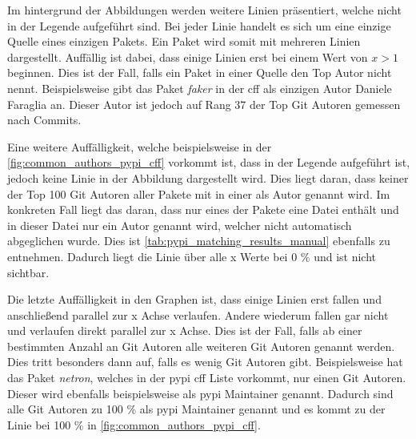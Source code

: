 Im hintergrund der Abbildungen werden weitere Linien präsentiert, welche nicht in der Legende aufgeführt sind.
Bei jeder Linie handelt es sich um eine einzige Quelle eines einzigen Pakets.
Ein Paket wird somit mit mehreren Linien dargestellt.
Auffällig ist dabei, dass einige Linien erst bei einem Wert von $x>1$ beginnen.
Dies ist der Fall, falls ein Paket in einer Quelle den Top Autor nicht nennt.
Beispielsweise gibt das Paket \emph{faker} in der \gls{cff} als einzigen Autor \glqq Daniele Faraglia\grqq{} an.
Dieser Autor ist jedoch auf Rang 37 der Top Git Autoren gemessen nach Commits.

Eine weitere Auffälligkeit, welche beispielsweise in der \autoref{fig:common_authors_pypi_cff} vorkommt ist, dass in der Legende  aufgeführt ist, jedoch keine Linie in der Abbildung dargestellt wird.
Dies liegt daran, dass keiner der Top 100 Git Autoren aller Pakete mit  in einer  als Autor genannt wird.
Im konkreten Fall liegt das daran, dass nur eines der Pakete eine  Datei enthält und in dieser Datei nur ein Autor genannt wird, welcher nicht automatisch abgeglichen wurde.
Dies ist \autoref{tab:pypi_matching_results_manual} ebenfalls zu entnehmen.
Dadurch liegt die Linie über alle x Werte bei 0 \% und ist nicht sichtbar.

Die letzte Auffälligkeit in den Graphen ist, dass einige Linien erst fallen und anschließend parallel zur x Achse verlaufen.
Andere wiederum fallen gar nicht und verlaufen direkt parallel zur x Achse.
Dies ist der Fall, falls ab einer bestimmten Anzahl an Git Autoren alle weiteren Git Autoren genannt werden.
Dies tritt besonders dann auf, falls es wenig Git Autoren gibt.
Beispielsweise hat das Paket \emph{netron}, welches in der \gls{pypi} \gls{cff} Liste vorkommt, nur einen Git Autoren.
Dieser wird ebenfalls beispielsweise als \gls{pypi} Maintainer genannt.
Dadurch sind alle Git Autoren zu 100 \% als \gls{pypi} Maintainer genannt und es kommt zu der Linie bei 100 \% in \autoref{fig:common_authors_pypi_cff}.

